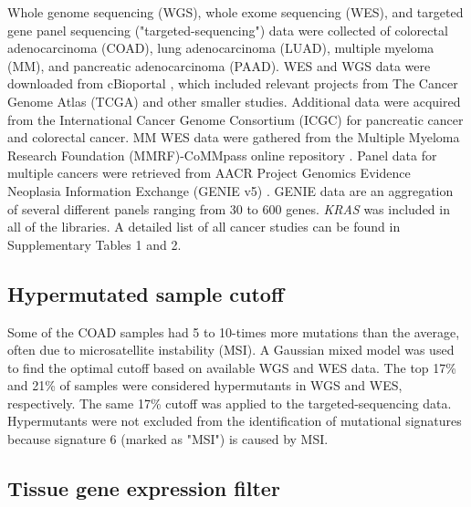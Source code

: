 \documentclass[english, 10pt, letterpaper]{article}
\newcommand{\KRAS}{\emph{KRAS}}
\begin{document}
Whole genome sequencing (WGS), whole exome sequencing (WES), and targeted gene panel sequencing ("targeted-sequencing") data were collected of colorectal adenocarcinoma (COAD), lung adenocarcinoma (LUAD), multiple myeloma (MM), and pancreatic adenocarcinoma (PAAD).
WES and WGS data were downloaded from cBioportal \cite{Gao2013, Cerami2012}, which included relevant projects from The Cancer Genome Atlas (TCGA) \cite{CancerGenomeAtlasNetwork2012, CancerGenomeAtlasResearchNetwork2014, CancerGenomeAtlasResearchNetwork.Electronicaddress:andrew_aguirredfci.harvard.edu2017} and other smaller studies. 
Additional data were acquired from the International Cancer Genome Consortium (ICGC) for pancreatic cancer \cite{Scarlett2011} and colorectal cancer. 
MM WES data were gathered from the Multiple Myeloma Research Foundation (MMRF)-CoMMpass online repository \cite{Walker2019AAnalysis.}.
Panel data for multiple cancers were retrieved from AACR Project Genomics Evidence Neoplasia Information Exchange (GENIE v5) \cite{AACRProjectGENIEConsortium2017AACRConsortium.}.
GENIE data are an aggregation of several different panels ranging from 30 to 600 genes.
\KRAS{} was included in all of the libraries. 
A detailed list of all cancer studies can be found in Supplementary Tables 1 and 2.


\subsection*{Hypermutated sample cutoff}

Some of the COAD samples had 5 to 10-times more mutations than the average, often due to microsatellite instability (MSI). 
A Gaussian mixed model was used to find the optimal cutoff based on available WGS and WES data. 
The top 17\% and 21\% of samples were considered hypermutants in WGS and WES, respectively.
The same 17\% cutoff was applied to the targeted-sequencing data. 
Hypermutants were not excluded from the identification of mutational signatures because signature 6 (marked as "MSI") is caused by MSI.


\subsection*{Tissue gene expression filter}
\end{document}
